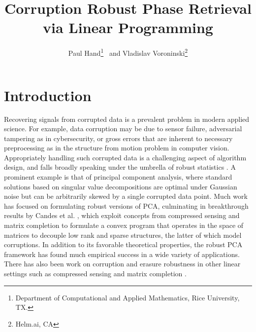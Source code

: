 \documentclass[12pt]{article}
\title{Corruption Robust Phase Retrieval via Linear Programming }
\author{
Paul Hand\footnote{Department of Computational and Applied Mathematics, Rice University, TX.} \   and Vladislav Voroninski\footnote{Helm.ai, CA}}
\newcommand{\1}{\mathbbm{1}}
\begin{document}
\maketitle
{}

\section{Introduction}
Recovering signals from corrupted data is a prevalent problem in modern applied science. For example, data corruption may be due to sensor failure, adversarial tampering as in cybersecurity, or gross errors that are inherent to necessary preprocessing as in the structure from motion problem in computer vision. Appropriately handling such corrupted data is a challenging aspect of algorithm design, and falls broadly speaking under the umbrella of robust statistics \cite{huber2011robust}. A prominent example is that of principal component analysis, where standard solutions based on singular value decompositions are optimal under Gaussian noise but can be arbitrarily skewed by a single corrupted data point. Much work has focused on formulating robust versions of PCA, culminating in breakthrough results by Candes et al. \cite{RPCA}, which exploit concepts from compressed sensing and matrix completion to formulate a convex program that operates in the space of matrices to decouple low rank and sparse structures, the latter of which model corruptions. In addition to its favorable theoretical properties, the robust PCA framework has found much empirical success in a wide variety of applications.  There has also been work on corruption and erasure robustness in other linear settings such as compressed sensing and matrix completion \cite{Li2013, voroninski2016strong, CJSC2013}.
\end{document}

